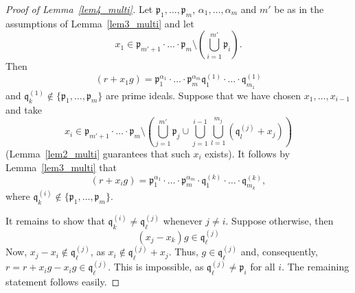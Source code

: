 \documentclass[leqno,a4paper,12pt]{article}
\theoremstyle{definition}
\newcommand{\divides}{\mid}
\newcommand{\ndivides}{\nmid}
\begin{document}
\begin{proof}[Proof of Lemma~\ref{lem4_multi}]
Let $\mathfrak{p}_1,\dots,\mathfrak{p}_m$, $\alpha_1,\ldots,\alpha_m$ and $m'$ be as in the assumptions of Lemma~\ref{lem3_multi} and let
\[
x_1\in\mathfrak{p}_{m'+1}\cdot\ldots\cdot\mathfrak{p}_m\setminus (\bigcup_{i=1}^{m'}\mathfrak{p}_i).
\]
Then
\[
(r+x_1g)=\mathfrak{p}_1^{\alpha_1}\cdot\ldots\cdot\mathfrak{p}_m^{\alpha_m}\mathfrak{q}_1^{(1)}\cdot\ldots\cdot\mathfrak{q}_{m_1}^{(1)}
\]
and $\mathfrak{q}_k^{(1)}\not\in\{\mathfrak{p}_1,\dots,\mathfrak{p}_m\}$ are prime ideals. Suppose that we have chosen $x_1,\dots, x_{i-1}$ and take
\[
x_i\in\mathfrak{p}_{m'+1}\cdot\ldots\cdot\mathfrak{p}_m\setminus \left(\bigcup_{j=1}^{m'}\mathfrak{p}_j\cup\bigcup_{j=1}^{i-1}\bigcup_{l=1}^{m_j}(\mathfrak{q}_l^{(j)}+x_j)\right)
\]
(Lemma~\ref{lem2_multi} guarantees that such $x_i$ exists). It follows by Lemma~\ref{lem3_multi} that
\[
(r+x_ig)=\mathfrak{p}_1^{\alpha_1}\cdot\ldots\cdot\mathfrak{p}_m^{\alpha_m}\cdot\mathfrak{q}_1^{(k)}\cdot\ldots\cdot\mathfrak{q}_{m_k}^{(k)},
\]
where $\mathfrak{q}_k^{(i)}\not\in\{\mathfrak{p}_1,\dots,\mathfrak{p}_m\}$.

It remains to show that
$\mathfrak{q}_k^{(i)}\neq \mathfrak{q}_\ell^{(j)}$ whenever $j\neq i$. Suppose otherwise, then
\[
(x_j-x_k)g\in\mathfrak{q}_\ell^{(j)}
\]
Now, $x_j-x_i\notin \mathfrak{q}_\ell^{(j)}$, as $x_i\not\in \mathfrak{q}_\ell^{(j)}+x_j$. Thus, $g\in \mathfrak{q}_\ell^{(j)}$ and, consequently, $r=r+x_ig-x_ig \in\mathfrak{q}_\ell^{(j)}$. This is impossible, as $\mathfrak{q}_\ell^{(j)}\neq \mathfrak{p}_i$ for all $i$. The remaining statement follows easily.


\end{proof}
\end{document}
